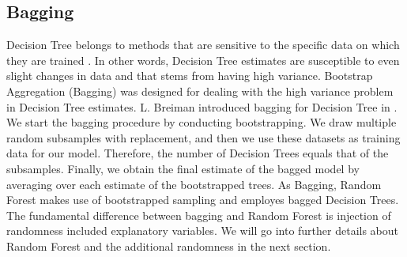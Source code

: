 \subsection{Bagging}
Decision Tree belongs to methods that are sensitive to the specific data on which they are trained \cite{friedman2001elements}. 
In other words, Decision Tree estimates are susceptible to even slight changes in data and 
that stems from having high variance.
Bootstrap Aggregation (Bagging) was designed for dealing with the high variance problem in Decision Tree estimates.
L. Breiman introduced bagging for Decision Tree in \cite{breiman1996bagging}.
We start the bagging procedure by conducting bootstrapping.
We draw multiple random subsamples with replacement,
and then we use these datasets as training data for our model.
Therefore, the number of Decision Trees equals that of the subsamples. 
Finally, we obtain the final estimate of the bagged model by averaging over each estimate of the bootstrapped trees.
As Bagging, Random Forest makes use of bootstrapped sampling and employes bagged Decision Trees.
The fundamental difference between bagging and Random Forest is 
injection of randomness included explanatory variables. 
We will go into further details about Random Forest and the additional randomness in the next section.
